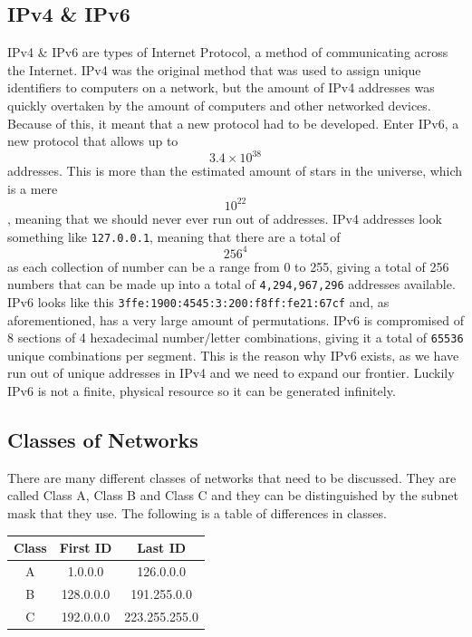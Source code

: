 \documentclass[a4paper,12pt]{article}
\begin{document}
\newpage

  \subsection{IPv4 \& IPv6}
    IPv4 \& IPv6 are types of Internet Protocol, a method of communicating across the Internet. IPv4 was the original method that was used to assign unique identifiers to computers on a network, but the amount of IPv4 addresses was quickly overtaken by the amount of computers and other networked devices. Because of this, it meant that a new protocol had to be developed. Enter IPv6, a new protocol that allows up to $${3.4 \times 10^38}$$addresses. This is more than the estimated amount of stars in the universe, which is a mere $${10^22}$$, meaning that we should never ever run out of addresses. IPv4 addresses look something like \texttt{127.0.0.1}, meaning that there are a total of $${256^4}$$ as each collection of number can be a range from 0 to 255, giving a total of 256 numbers that can be made up into a total of \texttt{4,294,967,296} addresses available. IPv6 looks like this \texttt{3ffe:1900:4545:3:200:f8ff:fe21:67cf} and, as aforementioned, has a very large amount of permutations. IPv6 is compromised of 8 sections of 4 hexadecimal number/letter combinations, giving it a total of \texttt{65536} unique combinations per segment. This is the reason why IPv6 exists, as we have run out of unique addresses in IPv4 and we need to expand our frontier. Luckily IPv6 is not a finite, physical resource so it can be generated infinitely.

  \subsection{Classes of Networks}
    There are many different classes of networks that need to be discussed. They are called Class A, Class B and Class C and they can be distinguished by the subnet mask that they use. The following is a table of differences in classes.

    \begin{center}
	\begin{tabular}{|c|c|c|}
	    \hline
	    Class & First ID & Last ID\\ \hline
	    A & 1.0.0.0 & 126.0.0.0\\ \hline
	    B & 128.0.0.0 & 191.255.0.0\\ \hline
	    C & 192.0.0.0 & 223.255.255.0\\ \hline
	    \hline
	\end{tabular}
    \end{center}
\end{document}
